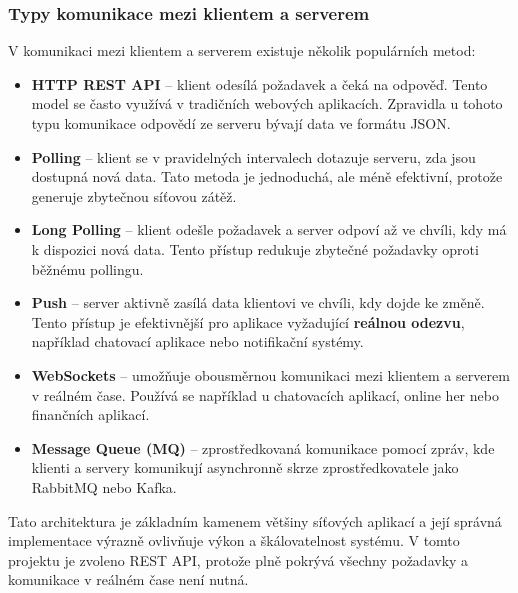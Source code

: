 \subsubsection{Typy komunikace mezi klientem a serverem}
V komunikaci mezi klientem a serverem existuje několik populárních metod:
\begin{itemize}
    \item \textbf{HTTP REST API} – klient odesílá požadavek a čeká na odpověď. Tento model se často využívá v tradičních webových aplikacích. Zpravidla u tohoto typu komunikace odpovědí ze serveru bývají data ve formátu JSON. 
    \item \textbf{Polling} – klient se v pravidelných intervalech dotazuje serveru, zda jsou dostupná nová data. Tato metoda je jednoduchá, ale méně efektivní, protože generuje zbytečnou síťovou zátěž.
    \item \textbf{Long Polling} – klient odešle požadavek a server odpoví až ve chvíli, kdy má k dispozici nová data. Tento přístup redukuje zbytečné požadavky oproti běžnému pollingu.
    \item \textbf{Push} – server aktivně zasílá data klientovi ve chvíli, kdy dojde ke změně. Tento přístup je efektivnější pro aplikace vyžadující \textbf{reálnou odezvu}, například chatovací aplikace nebo notifikační systémy.
    \item \textbf{WebSockets} – umožňuje obousměrnou komunikaci mezi klientem a serverem v reálném čase. Používá se například u chatovacích aplikací, online her nebo finančních aplikací.
    \item \textbf{Message Queue (MQ)} – zprostředkovaná komunikace pomocí zpráv, kde klienti a servery komunikují asynchronně skrze zprostředkovatele jako RabbitMQ nebo Kafka.
\end{itemize}

Tato architektura je základním kamenem většiny síťových aplikací a její správná implementace výrazně ovlivňuje výkon a škálovatelnost systému. V tomto projektu je zvoleno REST API, protože plně pokrývá všechny požadavky a komunikace v reálném čase není nutná.

